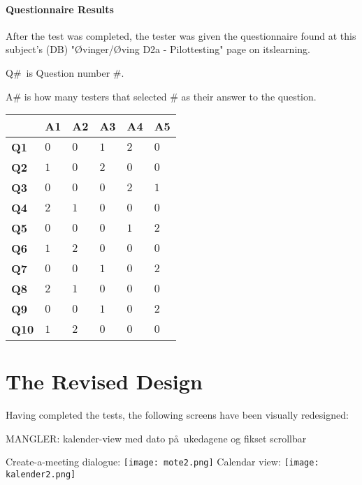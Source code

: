 \documentclass{article}
\begin{document}
\subsection{Questionnaire Results}

After the test was completed, the tester was given the questionnaire found
at this subject's (DB) "\O vinger/\O ving D2a - Pilottesting" page on
itslearning.

Q\#\ is Question number \#.

A\# is how many testers that selected \# as their answer to the question.

\begin{tabular}{|l|l|l|l|l|l|}
\hline
& \textbf{A1} & \textbf{A2} & \textbf{A3} & \textbf{A4} & \textbf{A5} \\ 
\hline
\textbf{Q1} & $0$ & $0$ & $1$ & $2$ & $0$ \\ \hline
\textbf{Q2} & $1$ & $0$ & $2$ & $0$ & $0$ \\ \hline
\textbf{Q3} & $0$ & $0$ & $0$ & $2$ & $1$ \\ \hline
\textbf{Q4} & $2$ & $1$ & $0$ & $0$ & $0$ \\ \hline
\textbf{Q5} & $0$ & $0$ & $0$ & $1$ & $2$ \\ \hline
\textbf{Q6} & $1$ & $2$ & $0$ & $0$ & $0$ \\ \hline
\textbf{Q7} & $0$ & $0$ & $1$ & $0$ & $2$ \\ \hline
\textbf{Q8} & $2$ & $1$ & $0$ & $0$ & $0$ \\ \hline
\textbf{Q9} & $0$ & $0$ & $1$ & $0$ & $2$ \\ \hline
\textbf{Q10} & $1$ & $2$ & $0$ & $0$ & $0$ \\ \hline
\end{tabular}
\newpage

\part{The Revised Design}

Having completed the tests, the following screens have been visually
redesigned:

\bigskip 

MANGLER: kalender-view med dato p\aa\ ukedagene og fikset scrollbar

Create-a-meeting dialogue: \newline
\texttt{[image: mote2.png]}\newline
Calendar view: \newline
\texttt{[image: kalender2.png]}\newline
\end{document}
